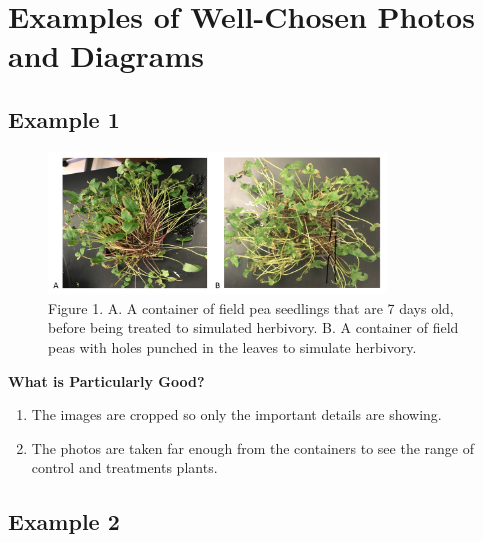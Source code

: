 \documentclass[
]{book}
\providecommand{\tightlist}{%
  \setlength{\itemsep}{0pt}\setlength{\parskip}{0pt}}
\begin{document}
\hypertarget{examples-of-well-chosen-photos-and-diagrams}{%
\section{Examples of Well-Chosen Photos and Diagrams}\label{examples-of-well-chosen-photos-and-diagrams}}

\hypertarget{example-1-13}{%
\subsection{Example 1}\label{example-1-13}}

\begin{figure}
\centering
\includegraphics[width=0.8\textwidth,height=\textheight]{images/Herbivory.png}
\caption{Figure 1. A. A container of field pea seedlings that are 7 days old, before being treated to simulated herbivory. B. A container of field peas with holes punched in the leaves to simulate herbivory.}
\end{figure}

\textbf{What is Particularly Good?}

\begin{enumerate}
\def\labelenumi{\arabic{enumi}.}
\tightlist
\item
  The images are cropped so only the important details are showing.
\item
  The photos are taken far enough from the containers to see the range of control and treatments plants.
\end{enumerate}

\hypertarget{example-2-13}{%
\subsection{Example 2}\label{example-2-13}}
\end{document}

